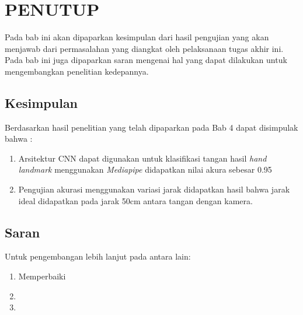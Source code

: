 \chapter{PENUTUP}
\label{chap:penutup}

Pada bab ini akan dipaparkan kesimpulan dari hasil pengujian yang akan menjawab dari permasalahan yang diangkat oleh pelaksanaan tugas akhir ini. Pada bab ini juga dipaparkan saran mengenai hal yang dapat dilakukan untuk mengembangkan penelitian kedepannya.

\section{Kesimpulan}
\label{sec:kesimpulan}

 Berdasarkan hasil penelitian yang telah dipaparkan pada Bab 4 dapat disimpulak bahwa :

\begin{enumerate}[nolistsep]

  \item Arsitektur CNN dapat digunakan untuk klasifikasi tangan hasil  \emph{hand landmark} menggunakan \emph{Mediapipe} didapatkan nilai akura sebesar 0.95

  \item Pengujian akurasi menggunakan variasi jarak didapatkan hasil bahwa jarak ideal didapatkan pada jarak 50cm antara tangan dengan kamera.


\end{enumerate}

\section{Saran}
\label{chap:saran}

Untuk pengembangan lebih lanjut pada \lipsum[1][1-3] antara lain:

\begin{enumerate}[nolistsep]

  \item Memperbaiki \lipsum[2][1-3]

  \item \lipsum[2][4-6]

  \item \lipsum[2][7-10]

\end{enumerate}
